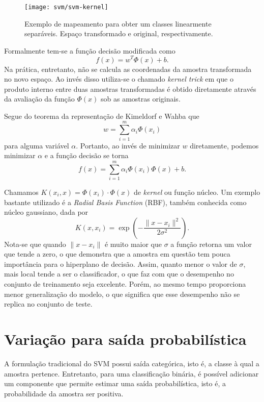 \begin{figure}
\centering
\texttt{[image: svm/svm-kernel]}
\caption{Exemplo de mapeamento para obter um classes linearmente separáveis. Espaço transformado e original, respectivamente.}
\label{fig:svm-kernel}
\end{figure}

Formalmente \cite{bishop2007} tem-se a função decisão modificada como
\begin{equation*}
f(x)=w^T \Phi(x) +b.
\end{equation*}
Na prática, entretanto, não se calcula as coordenadas da amostra transformada no novo espaço. Ao invés disso utiliza-se o chamado \textit{kernel trick} \cite{bishop2007} em que o produto interno entre duas amostras transformadas é obtido diretamente através da avaliação da função $\Phi(x)$ sob as amostras originais.

Segue do teorema da representação de Kimeldorf e Wahba \cite{kimeldorf1970correspondence} que
\begin{equation}
	\label{eq:teo-kimeldorf}
	w=\sum_{i=1}^m \alpha_i \Phi(x_i)
\end{equation}
para alguma variável $\alpha$. Portanto, ao invés de minimizar $w$ diretamente, podemos minimizar $\alpha$ e a função decisão se torna
\begin{equation}
	\label{eq:svm-decision-func}
	f(x)=\sum_{i=1}^m \alpha_i \Phi(x_i) \Phi(x) +b.
\end{equation}

Chamamos $K(x_i, x) = \Phi(x_i) \cdot \Phi(x)$ de \textit{kernel} ou função núcleo. Um exemplo bastante utilizado é a \textit{Radial Basis Function} (RBF), também conhecida como núcleo gaussiano, dada por
\begin{equation}
	\label{eq:svm-kernel-func}
	K(x,x_i) = \exp\left(-\frac{\|x-x_i\|^2}{2\sigma^2}\right).
\end{equation}
Nota-se que quando $\|x-x_i\|$ é muito maior que $\sigma$ a função retorna um valor que tende a zero, o que demonstra que a amostra em questão tem pouca importância para o hiperplano de decisão. Assim, quanto menor o valor de $\sigma$, mais local tende a ser o classificador, o que faz com que o desempenho no conjunto de treinamento seja excelente. Porém, ao mesmo tempo proporciona menor generalização do modelo, o que significa que esse desempenho não se replica no conjunto de teste.

\section{Variação para saída probabilística}
\label{sec:svm-probabilistic}
A formulação tradicional do SVM possui saída categórica, isto é, a classe à qual a amostra pertence. Entretanto, para uma classificação binária, é possível adicionar um componente que permite estimar uma saída probabilística, isto é, a probabilidade da amostra ser positiva.

